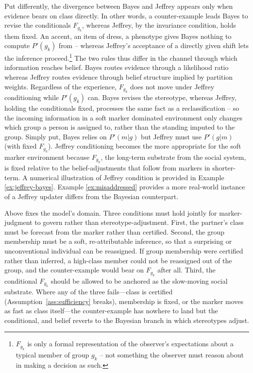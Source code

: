 \documentclass[pdflatex,sn-basic]{sn-jnl}
\theoremstyle{thmstyleone}
\numberwithin{proposition}{subsection}
\begin{document}
Put differently, the divergence between Bayes and Jeffrey appears only when evidence bears on class directly. In other words, a counter-example leads Bayes to revise the conditionals $F_{g_k}$, whereas Jeffrey, by
the invariance condition, holds them fixed. An accent, an item of dress, a phenotype gives
Bayes nothing to compute $P'(g_k)$ from -- whereas Jeffrey's acceptance of
a directly given shift lets the inference proceed.\footnote{$F_{g_k}$
is only a formal representation of the observer's expectations
about a typical member of group $g_k$ -- not something the observer
must reason about in making a decision as such.} The two rules thus differ in the channel through which
information reaches belief. Bayes routes evidence through a likelihood ratio
whereas Jeffrey routes evidence through belief structure implied by partition weights. Regardless of the experience, $F_{g_k}$ does not move under Jeffrey conditioning while $P'(g_k)$ can. Bayes revises the stereotype, whereas Jeffrey, holding the
conditionals fixed, processes the same fact as a reclassification -- so the incoming information in a soft marker dominated environment only changes which group a person is
assigned to, rather than the standing imputed to the group. Simply put, Bayes relies on $P'(m|g)$ but Jeffrey must use $P'(g|m)$ (with fixed $F_{g_k}$). Jeffrey conditioning becomes the more appropriate for the soft marker environment because $F_{g_k}$, the long-term substrate from the social system, is fixed relative to the belief-adjustments that follow from markers in shorter-term. A numerical illustration of Jeffrey condition is provided in Example \ref{ex:jeffrey-bayes}. Example \ref{ex:misaddressed} provides a more real-world instance of a Jeffrey updater differs from the Bayesian counterpart.

Above fixes the model's domain. Three conditions must hold jointly for
marker-judgment to govern rather than stereotype-adjustment. First, the
partner's class must be forecast from the marker rather than certified. Second, the group
membership must be a soft, re-attributable inference, so that a
surprising or unconventional individual can be reassigned. If group membership were certified rather than inferred, a high-class member could not be reassigned out of the group,
and the counter-example would bear on $F_{g_k}$ after all.  Third, the conditional $F_{g_k}$ should be allowed to be anchored as the slow-moving social substrate. Where any of
the three fails---class is certified (Assumption~\ref{ass:sufficiency}
breaks), membership is fixed, or the marker
moves as fast as class itself---the counter-example has nowhere to land
but the conditional, and belief reverts to the Bayesian branch in which
stereotypes adjust.
\end{document}
